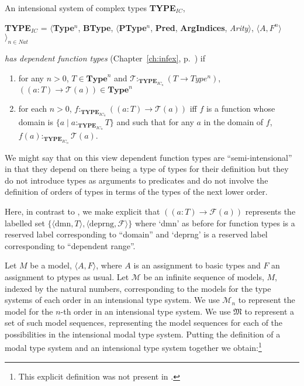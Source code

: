 \label{pg:dep-fn-types}An intensional system of complex types \textbf{TYPE}$_\mathit{IC}$,
\begin{display}
{\bf TYPE$_\mathit{IC}$} = $\langle${\bf Type}$^n$, {\bf BType},
$\langle$\textbf{PType}$^n$, {\bf Pred}, \textbf{ArgIndices}, {\it
  Arity\/}$\rangle$, $\langle A,F^n\rangle$$\rangle_{n\in\mathit{Nat}}$
\end{display} 
\textit{has dependent function types} (Chapter~\ref{ch:infex},
p.~\pageref{ex:dep-fun-types}) if
\begin{enumerate} 
 
\item for any $n>0$, $T \in \mathbf{Type}^n$ and
  $\mathcal{T}:_{\mathbf{TYPE}_{\mathit{IC}_n}}(T\rightarrow\mathit{Type^n})$,
  $((a:T)\rightarrow \mathcal{T}(a)) \in \mathbf{Type}^n$ 
 
\item for each $n>0$,
$f:_{\mathbf{TYPE}_{\mathit{IC}_n}}((a:T)\rightarrow \mathcal{T}(a))$
iff $f$ is a function whose domain is $\{a\mid
a:_{\mathbf{TYPE}_{\mathit{IC}_n}}T\}$ and such that for any $a$ in the
domain of $f$, $f(a):_{\mathbf{TYPE}_{\mathit{IC}_n}}\mathcal{T}(a)$.
   
 
\end{enumerate} 
We might say that on this view dependent function types are
``semi-intensional'' in that they depend on there being a type of
types for their definition but they do not introduce types as
arguments to predicates and do not involve the definition of orders of
types in terms of the types of the next lower order.

Here, in contrast to \cite{Cooper2012}, we make explicit that
$((a:T)\rightarrow \mathcal{F}(a))$ represents the labelled set
$\{\langle\mathrm{dmn},T\rangle,\langle\mathrm{deprng},\mathcal{F}\rangle\}$
where `dmn' as before for function types is a reserved label
corresponding to ``domain'' and `deprng' is a reserved label
corresponding to ``dependent range''.

Let $M$ be a model, $\langle A,F\rangle$, where
$A$ is an assignment to basic types and $F$ an assignment to ptypes as
usual.  Let $\mathcal{M}$ be an infinite sequence of models, $M$, indexed by
the natural numbers, corresponding to the models for the type systems
of each order in an intensional type system.  We use $\mathcal{M}_n$
to represent the model for the $n$-th order in an intensional type
system.  We use $\mathfrak{M}$ to represent a set of such model
sequences, representing the model sequences for each of the
possibilities in the intensional modal type system.  Putting the definition of a modal type system and an intensional type
system together we obtain:\footnote{This explicit definition was not
  present in \cite{Cooper2012}.}

